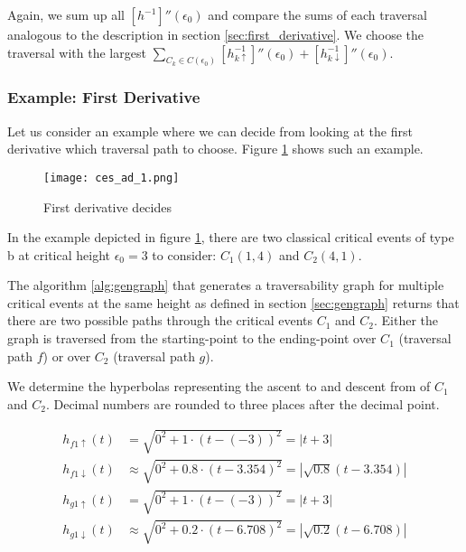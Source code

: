 Again, we sum up all $[h^{-1}]''(\epsilon_0)$ and compare the sums of each traversal analogous to the description in section \ref{sec:first_derivative}. We choose the traversal with the largest $\sum\nolimits_{C_k \in C(\epsilon_0)}[h_{k\uparrow}^{-1}]''(\epsilon_0) + [h_{k\downarrow}^{-1}]''(\epsilon_0)$.


\subsubsection{Example: First Derivative}

Let us consider an example where we can decide from looking at the first derivative which traversal path to choose. Figure \ref{fig:ces_ad_1} shows such an example.

 \begin{figure}[H]
    \centering
    
    \texttt{[image: ces\_ad\_1.png]}
		
	\caption{First derivative decides\protect\footnotemark}
    \label{fig:ces_ad_1}
\end{figure}

In the example depicted in figure \ref{fig:ces_ad_1}, there are two classical critical events of type b at critical height $\epsilon_0 = 3$ to consider: $C_1(1, 4)$ and $C_2(4, 1)$.

The algorithm \ref{alg:gengraph} that generates a traversability graph for multiple critical events at the same height as defined in section \ref{sec:gengraph} returns that there are two possible paths through the critical events $C_1$ and $C_2$. Either the graph is traversed from the starting-point to the ending-point over $C_1$ (traversal path $f$) or over $C_2$ (traversal path $g$).

We determine the hyperbolas representing the ascent to and descent from of $C_1$ and $C_2$. Decimal numbers are rounded to three places after the decimal point.

\begin{align*}
	h_{f1\uparrow}(t) &= \sqrt{0^2 + 1\cdot(t - (-3))^2} = \left| t + 3 \right|\\
	h_{f1\downarrow}(t) &\approx \sqrt{0^2 + 0.8\cdot(t - 3.354)^2} = \left| \sqrt{0.8}(t - 3.354) \right|\\
	h_{g1\uparrow}(t) &= \sqrt{0^2 + 1\cdot(t - (-3))^2} = \left| t + 3 \right|\\
	h_{g1\downarrow}(t) &\approx \sqrt{0^2 + 0.2\cdot(t - 6.708)^2} = \left| \sqrt{0.2}(t - 6.708) \right|
\end{align*}

